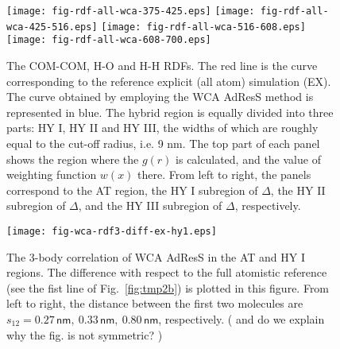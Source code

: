 \documentclass[aip,jcp,a4paper,reprint,onecolumn]{revtex4-1}
\newcommand{\bluec}[1]{{\color{blue} #1}}
\begin{document}
\begin{figure}
  \centering
  \texttt{[image: fig-rdf-all-wca-375-425.eps]}
  \texttt{[image: fig-rdf-all-wca-425-516.eps]}
  \texttt{[image: fig-rdf-all-wca-516-608.eps]}
  \texttt{[image: fig-rdf-all-wca-608-700.eps]}
  \caption{
    The COM-COM, H-O and H-H RDFs. 
    The red line is the curve corresponding to the reference explicit (all atom)
    simulation (EX).
    The curve obtained by employing the WCA AdResS 
    method is represented in blue.
    The hybrid region is equally
    divided into three parts: HY I, HY II and HY III, the widths of
    which are roughly equal to the cut-off radius, i.e. 9 \textsf{nm}.    
    The top part of each panel shows the region where the $g(r)$ is calculated,
    and the value of weighting function $w(x)$ there.
    From left to right, the panels correspond to the AT region, 
    the HY I subregion of $\Delta$,
    the HY II subregion of $\Delta$,
    and the HY III subregion of $\Delta$, respectively. 
  }
  \label{fig:wca-dist}
\end{figure}

\begin{figure}
  \centering
  \texttt{[image: fig-wca-rdf3-diff-ex-hy1.eps]}
  \caption{The 3-body correlation of WCA AdResS in the AT
    and HY I regions.
    The difference with respect to the full atomistic reference
    (see the fist line of Fig.~\ref{fig:tmp2b})
    is plotted in this figure. From left to right, the distance
    between the first two molecules are \bluec{$s_{12} =
    0.27\,\textsf{nm},\ 0.33\,\textsf{nm},\  
    0.80\,\textsf{nm}$, respectively.
  ( and do we explain why the fig. is not symmetric? )}
  }
  \label{fig:wca-g3}
\end{figure}
\end{document}

